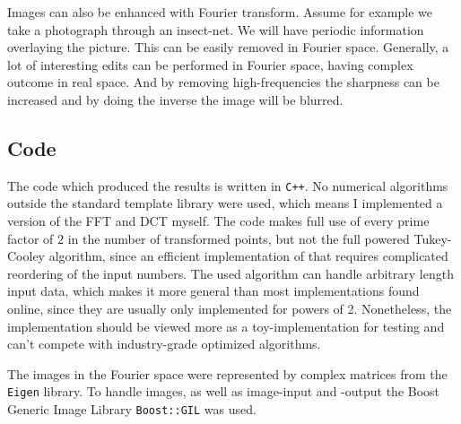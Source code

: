 Images can also be enhanced with Fourier transform. Assume for example we take a photograph through an insect-net.
We will have periodic information overlaying the picture. This can be easily removed in Fourier space.
Generally, a lot of interesting edits can be performed in Fourier space, having complex outcome in real space.
And by removing high-frequencies the sharpness can be increased and by doing the inverse the image will be blurred.


\subsection{Code}
The code which produced the results is written in \texttt{C++}.
No numerical algorithms outside the standard template library were used, which
means I implemented a version of the FFT and DCT myself.
The code makes full use of every prime factor of $2$ in the number of transformed points,
but not the full powered Tukey-Cooley algorithm, since an efficient implementation of that
requires complicated reordering of the input numbers.
The used algorithm can handle arbitrary length input data, which makes it
more general than most implementations found online, since they are usually only implemented
for powers of 2.
Nonetheless, the implementation should be viewed more as a toy-implementation for testing
and can't compete with industry-grade optimized algorithms.

The images in the Fourier space were represented by complex matrices from the \texttt{Eigen}
library.
To handle images, as well as image-input and -output the Boost Generic Image Library \texttt{Boost::GIL} was used.